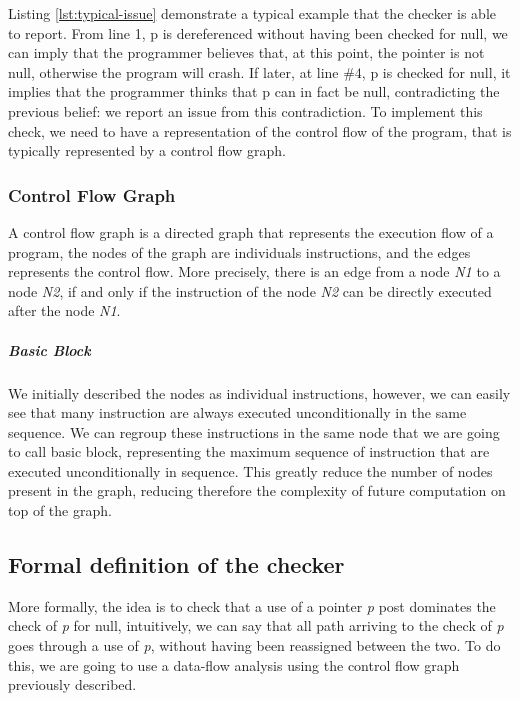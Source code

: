 

Listing \ref{lst:typical-issue} demonstrate a typical example that the checker is able to report. 
From line 1, p is dereferenced without having been checked for null, we can imply that the programmer believes that, at this point, the pointer is not null, otherwise the program will crash. 
If later, at line $\#4$, p is checked for null, it implies that the programmer thinks that p can in fact be null, contradicting the previous belief: we report an issue from this contradiction.
To implement this check, we need to have a representation of the control flow of the program, that is typically represented by a control flow graph.

\subsubsection{Control Flow Graph}
\label{subsubsec:control_flow_graph}

A control flow graph is a directed graph that represents the execution flow of a program, the nodes of the graph are individuals instructions, and the edges represents the control flow. More precisely, there is an edge from a node \emph{N1} to a node \emph{N2}, if and only if the instruction of the node \emph{N2} can be directly executed after the node \emph{N1}.


\subparagraph{Basic Block}
We initially described the nodes as individual instructions, however, we can easily see that many instruction are always executed unconditionally in the same sequence.
We can regroup these instructions in the same node that we are going to call basic block, representing the maximum sequence of instruction that are executed unconditionally in sequence. 
This greatly reduce the number of nodes present in the graph, reducing therefore the complexity of future computation on top of the graph.

\subsection{Formal definition of the checker}
\label{subsec:checker_formal_definition}
More formally, the idea is to check that a use of a pointer \emph{p} post dominates the check of \emph{p} for null, intuitively, we can say that all path arriving to the check of \emph{p} goes through a use of \emph{p}, without having been reassigned between the two. 
To do this, we are going to use a data-flow analysis using the control flow graph previously described.

